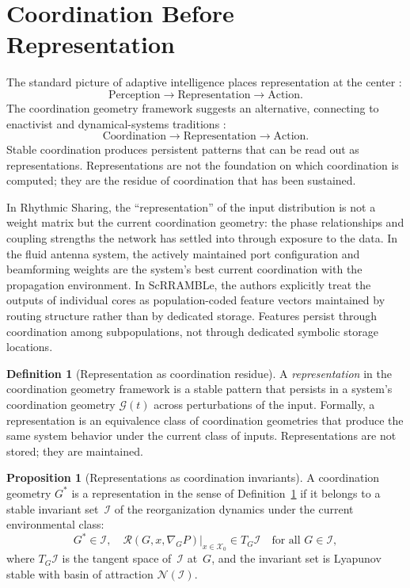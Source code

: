 \documentclass[11pt, a4paper]{article}
\theoremstyle{definition}
\newtheorem{definition}{Definition}
\newtheorem{proposition}{Proposition}
\theoremstyle{remark}
\begin{document}
\section{Coordination Before Representation}

The standard picture of adaptive intelligence places representation at the
center \cite{clark2016}:
\[
\text{Perception} \to \text{Representation} \to \text{Action.}
\]
The coordination geometry framework suggests an alternative, connecting to
enactivist and dynamical-systems traditions \cite{varela1991, beer2000,
gibson1979}:
\[
\text{Coordination} \to \text{Representation} \to \text{Action.}
\]
Stable coordination produces persistent patterns that can be read out as
representations. Representations are not the foundation on which coordination
is computed; they are the residue of coordination that has been sustained.

In Rhythmic Sharing, the ``representation'' of the input distribution is not
a weight matrix but the current coordination geometry: the phase relationships
and coupling strengths the network has settled into through exposure to the
data. In the fluid antenna system, the actively maintained port configuration
and beamforming weights are the system's best current coordination with the
propagation environment. In ScRRAMBLe, the authors explicitly treat the
outputs of individual cores as population-coded feature vectors maintained
by routing structure rather than by dedicated storage. Features persist
through coordination among subpopulations, not through dedicated symbolic
storage locations.

\begin{definition}[Representation as coordination residue]
\label{def:rep}
A \textit{representation} in the coordination geometry framework is a stable
pattern that persists in a system's coordination geometry $\mathcal{G}(t)$
across perturbations of the input. Formally, a representation is an
equivalence class of coordination geometries that produce the same system
behavior under the current class of inputs. Representations are not stored;
they are maintained.
\end{definition}

\begin{proposition}[Representations as coordination invariants]
\label{prop:attractors}
A coordination geometry $G^*$ is a representation in the sense of
Definition~\ref{def:rep} if it belongs to a stable invariant set~$\mathcal{I}$
of the reorganization dynamics under the current environmental class:
\[
G^* \in \mathcal{I}, \quad
\mathcal{R}(G, x, \nabla_G P)\big|_{x \in \mathcal{X}_0} \in T_G\mathcal{I}
\quad \text{for all } G \in \mathcal{I},
\]
where $T_G\mathcal{I}$ is the tangent space of~$\mathcal{I}$ at~$G$, and
the invariant set is Lyapunov stable with basin of attraction
$\mathcal{N}(\mathcal{I})$.
\end{proposition}
\end{document}
